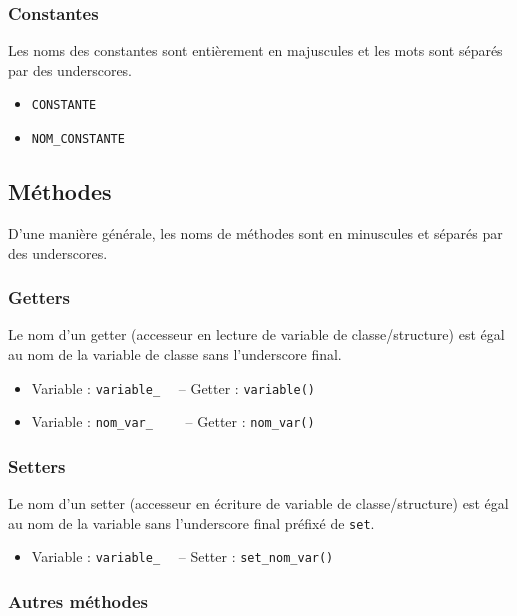 \documentclass[]{report}
\begin{document}
\subsubsection{Constantes}

Les noms des constantes sont entièrement en majuscules et les mots sont
séparés par des underscores.

\begin{itemize}
	\item \texttt{CONSTANTE}
	\item \texttt{NOM\_CONSTANTE}
\end{itemize}

\subsection{Méthodes}

D'une manière générale, les noms de méthodes sont en minuscules et
séparés par des underscores.

\subsubsection{Getters}

Le nom d'un getter (accesseur en lecture de variable de classe/structure)
est égal au nom de la variable de classe sans l'underscore final.

\begin{itemize}
	\item Variable : \texttt{variable\_} ~~-- Getter : \texttt{variable()}
	\item Variable : \texttt{nom\_var\_} ~~~~-- Getter : \texttt{nom\_var()}
\end{itemize}

\subsubsection{Setters}

Le nom d'un setter (accesseur en écriture de variable de classe/structure)
est égal au nom de la variable sans l'underscore final préfixé de \texttt{set}.

\begin{itemize}
	\item Variable : \texttt{variable\_} ~~-- Setter : \texttt{set\_nom\_var()}
\end{itemize}

\subsubsection{Autres méthodes}
\end{document}
